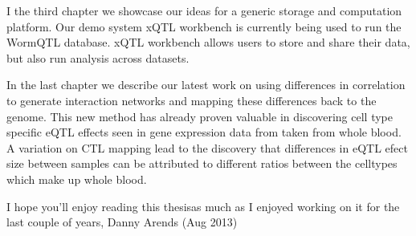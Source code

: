 I the third chapter we showcase our ideas for a generic storage and computation platform. Our demo system xQTL 
workbench is currently being used to run the WormQTL database. xQTL workbench allows users to store and share 
their data, but also run analysis across datasets.

In the last chapter we describe our latest work on using differences in correlation to generate interaction 
networks and mapping these differences back to the genome. This new method has already proven valuable in 
discovering cell type specific eQTL effects seen in gene expression data from taken from whole blood. A 
variation on CTL mapping lead to the discovery that differences in eQTL efect size between samples can be 
attributed to different ratios between the celltypes which make up whole blood.

I hope you'll enjoy reading this thesisas much as I enjoyed working on it for the last couple of years,
Danny Arends (Aug 2013)
